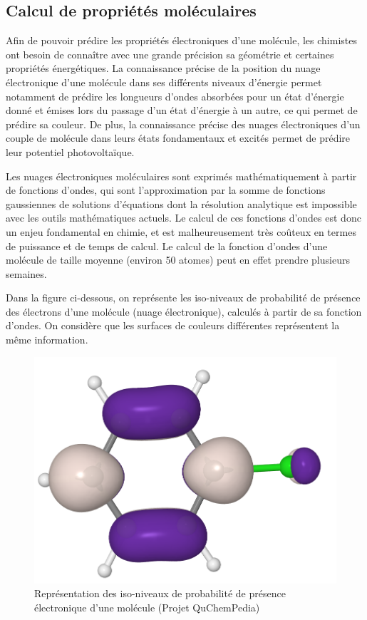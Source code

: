 \subsection{Calcul de propriétés moléculaires}

\par Afin de pouvoir prédire les propriétés électroniques d'une molécule, les chimistes ont besoin de connaître avec une grande précision sa géométrie et certaines propriétés énergétiques. La connaissance précise de la position du nuage électronique d'une molécule dans ses différents niveaux d'énergie permet notamment de prédire les longueurs d'ondes absorbées pour un état d'énergie donné et émises lors du passage d'un état d'énergie à un autre, ce qui permet de prédire sa couleur.
De plus, la connaissance précise des nuages électroniques d'un couple de molécule dans leurs états fondamentaux et excités permet de prédire leur potentiel photovoltaïque. \\

\par Les nuages électroniques moléculaires sont exprimés mathématiquement à partir de fonctions d'ondes, qui sont l'approximation par la somme de fonctions gaussiennes de solutions d'équations dont la résolution analytique est impossible avec les outils mathématiques actuels. Le calcul de ces fonctions d'ondes est donc un enjeu fondamental en chimie, et est malheureusement très coûteux en termes de puissance et de temps de calcul. Le calcul de la fonction d'ondes d'une molécule de taille moyenne (environ 50 atomes) peut en effet prendre plusieurs semaines. \\

\par Dans la figure ci-dessous, on représente les iso-niveaux de probabilité de présence des électrons d'une molécule (nuage électronique), calculés à partir de sa fonction d'ondes. On considère que les surfaces de couleurs différentes représentent la même information.\\ 

\begin{figure}[!h]
	\centering
	\includegraphics[scale=0.25]{images/iso_niveaux.png}
	\caption{Représentation des iso-niveaux de probabilité de présence électronique d'une molécule (Projet QuChemPedia)}
\end{figure}

